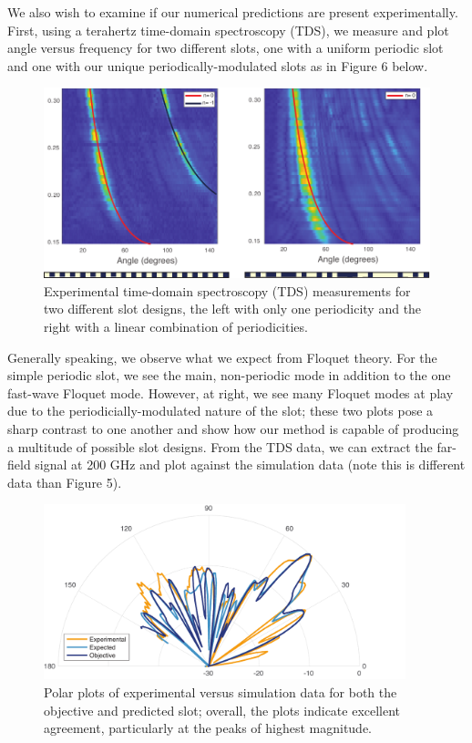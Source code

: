 \documentclass[11pt]{article}
\begin{document}
\noindent We also wish to examine if our numerical predictions are present experimentally. First, using a terahertz time-domain spectroscopy (TDS), we measure and plot angle versus frequency for two different slots, one with a uniform periodic slot and one with our unique periodically-modulated slots as in Figure 6 below.

\begin{figure}[H]
	\centering
	\includegraphics{figures/exp-fig1pdf}
	\caption{Experimental time-domain spectroscopy (TDS) measurements for two different slot designs, the left with only one periodicity and the right with a linear combination of periodicities.}
\end{figure}

\noindent Generally speaking, we observe what we expect from Floquet theory. For the simple periodic slot, we see the main, non-periodic mode in addition to the one fast-wave Floquet mode. However, at right, we see many Floquet modes at play due to the periodicially-modulated nature of the slot; these two plots pose a sharp contrast to one another and show how our method is capable of producing a multitude of possible slot designs. From the TDS data, we can extract the far-field signal at 200 GHz and plot against the simulation data (note this is different data than Figure 5).

\begin{figure}[H]
	\centering
	\includegraphics[height=2in]{figures/477exppdf}
	\caption{Polar plots of experimental versus simulation data for both the objective and predicted slot; overall, the plots indicate excellent agreement, particularly at the peaks of highest magnitude.}
\end{figure}
\end{document}
